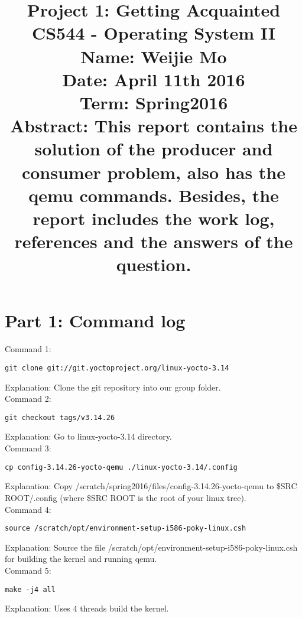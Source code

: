 \documentclass[10pt,draftclsnofoot,peerreview,letterpaper,onecolumn,]{IEEEtran}
\begin{document}
\break
\break
\break
\break
\break
\title{
\textbf{Project 1: Getting Acquainted}\\
\hfill \break
\hfill \break
\hfill \break
\hfill \break
\hfill \break
\large{CS544 - Operating System II\\
\hfill \break
Name: Weijie Mo\\
\hfill \break
Date: April 11th 2016\\
\hfill \break
Term: Spring2016\\
\hfill \break
}
\hfill \break
\hfill \break
\hfill \break
\hfill \break
\hfill \break
\large{Abstract:
This report contains the solution of the producer and consumer problem, also has the qemu commands. Besides, the report includes the work log, references and the answers of the question.
}
}

\IEEEpeerreviewmaketitle{ }

\newpage

\section{Part 1: Command log}
Command 1:
\begin{verbatim}
git clone git://git.yoctoproject.org/linux-yocto-3.14
\end{verbatim}
Explanation: Clone the git repository into our group folder.\\

Command 2:
\begin{verbatim}
git checkout tags/v3.14.26
\end{verbatim}
Explanation: Go to linux-yocto-3.14 directory.\\

Command 3:
\begin{verbatim}
cp config-3.14.26-yocto-qemu ./linux-yocto-3.14/.config
\end{verbatim}
Explanation: Copy /scratch/spring2016/files/config-3.14.26-yocto-qemu to \$SRC ROOT/.config (where \$SRC ROOT is the root of your linux tree).\\

Command 4:
\begin{verbatim}
source /scratch/opt/environment-setup-i586-poky-linux.csh
\end{verbatim}
Explanation: Source the file /scratch/opt/environment-setup-i586-poky-linux.csh for building the kernel and running qemu.\\

Command 5:
\begin{verbatim}
make -j4 all
\end{verbatim}
Explanation: Uses 4 threads build the kernel.\\
\end{document}
